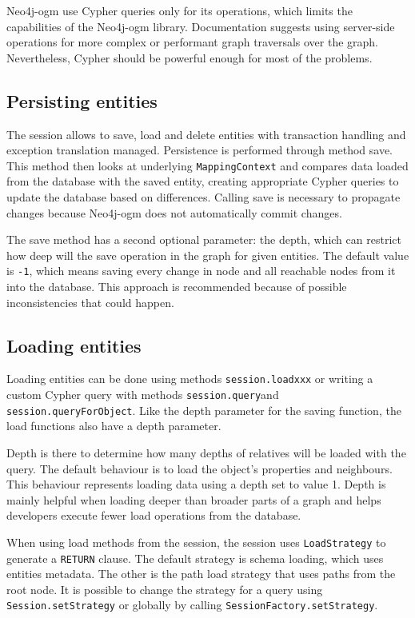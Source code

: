 Neo4j-\acrshort{ogm} use Cypher queries only for its operations, which limits the capabilities of the Neo4j-\acrshort{ogm} library.
Documentation suggests using server-side operations for more complex or performant graph traversals over the graph.
Nevertheless, Cypher should be powerful enough for most of the problems.

\subsection {Persisting entities}

The session allows to save, load and delete entities with transaction handling and exception translation managed.
Persistence is performed through method save. This method then looks at underlying \texttt{MappingContext} and compares data loaded
from the database with the saved entity, creating appropriate Cypher queries to update the database based on differences.
Calling save is necessary to propagate changes because Neo4j-\acrshort{ogm} does not automatically commit changes.

The save method has a second optional parameter: the depth, which can restrict how deep will the save operation in the graph for given entities.
The default value is \texttt{-1}, which means saving every change in node and all reachable nodes from it into the database.
This approach is recommended because of possible inconsistencies that could happen.

\subsection {Loading entities}

Loading entities can be done using methods \texttt{session.loadxxx} or writing a custom Cypher query with methods \texttt{session.query}\linebreak and \texttt{session.queryForObject}.
Like the depth parameter for the saving function, the load functions also have a depth parameter.

Depth is there to determine how many depths of relatives will be loaded with the query.
The default behaviour is to load the object's properties and neighbours.
This behaviour represents loading data using a depth set to value 1.
Depth is mainly helpful when loading deeper than broader parts of a graph and helps developers execute fewer load operations from the database.

When using load methods from the session, the session uses \texttt{LoadStrategy} to generate a \texttt{RETURN} clause. The default strategy is schema loading,
which uses entities metadata. The other is the path load strategy that uses paths from the root node. It is possible to change the strategy for a query using \texttt{Session.setStrategy}
or globally by calling \texttt{SessionFactory.setStrategy}.

